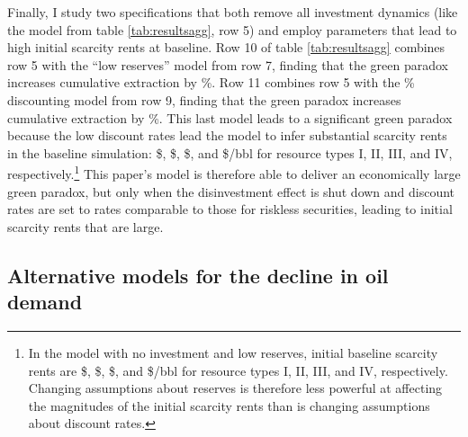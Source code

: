 \documentclass[12pt]{article}
\begin{document}
Finally, I study two specifications that both remove all investment dynamics (like the model from table \ref{tab:resultsagg}, row 5) and employ parameters that lead to high initial scarcity rents at baseline. Row 10 of table \ref{tab:resultsagg} combines row 5 with the ``low reserves'' model from row 7, finding that the green paradox increases cumulative extraction by \unskip\%. Row 11 combines row 5 with the \unskip\% discounting model from row 9, finding that the green paradox increases cumulative extraction by \unskip\%. This last model leads to a significant green paradox because the low discount rates lead the model to infer substantial scarcity rents in the baseline simulation: \$\unskip, \$\unskip, \$\unskip, and \$\unskip/bbl for resource types I, II, III, and IV, respectively.\footnote{In the model with no investment and low reserves, initial baseline scarcity rents are \$\unskip, \$\unskip, \$\unskip, and \$\unskip/bbl for resource types I, II, III, and IV, respectively. Changing assumptions about reserves is therefore less powerful at affecting the magnitudes of the initial scarcity rents than is changing assumptions about discount rates.} This paper's model is therefore able to deliver an economically large green paradox, but only when the disinvestment effect is shut down and discount rates are set to rates comparable to those for riskless securities, leading to initial scarcity rents that are large. 





\subsection{Alternative models for the decline in oil demand} \label{sec:results_alt2}
\end{document}
